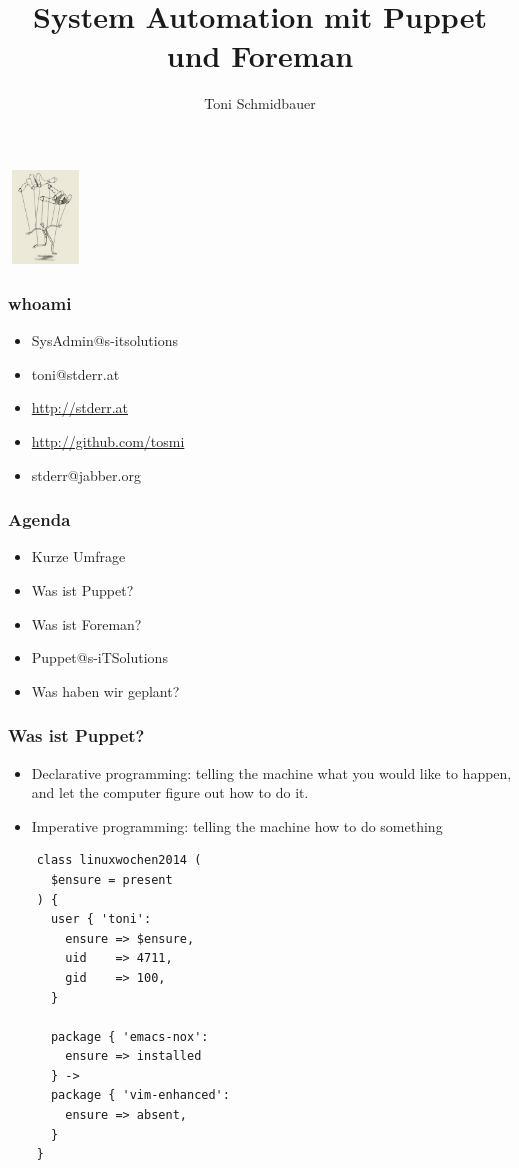 \documentclass{beamer}
\title{System Automation mit Puppet und Foreman\\}
\author{Toni Schmidbauer}
\begin{document}
\begin{frame}
\center\includegraphics[height=2.5cm,width=2cm]{../pics/puppet.png}
\titlepage

\end{frame}

\begin{frame}
  \frametitle{whoami}
  \begin{itemize}
  \item SysAdmin@s-itsolutions
  \item toni@stderr.at
  \item \url{http://stderr.at}
  \item \url{http://github.com/tosmi}
  \item stderr@jabber.org
  \end{itemize}
\end{frame}
\begin{frame}

  \frametitle{Agenda}

  \begin{itemize}
  \item Kurze Umfrage
  \item Was ist Puppet?
  \item Was ist Foreman?
  \item Puppet@s-iTSolutions
  \item Was haben wir geplant?
  \end{itemize}

\end{frame}

\begin{frame}
\end{frame}

\begin{frame}[fragile]
  \frametitle{Was ist Puppet?}

  \begin{itemize}
  \item Declarative programming: telling the machine what you would
    like to happen, and let the computer figure out how to do it.
  \item \tiny{Imperative programming: telling the machine how to do
    something}
  \end{itemize}

  \begin{lstlisting}
    class linuxwochen2014 (
      $ensure = present
    ) {
      user { 'toni':
        ensure => $ensure,
        uid    => 4711,
        gid    => 100,
      }

      package { 'emacs-nox':
        ensure => installed
      } ->
      package { 'vim-enhanced':
        ensure => absent,
      }
    }
  \end{lstlisting}
\end{frame}
\end{document}
